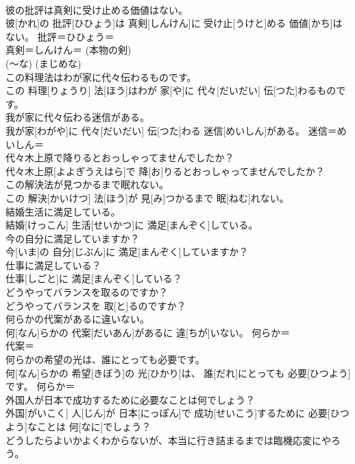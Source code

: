 \documentclass[8pt]{extreport}
\begin{document}
\begin{CJK}{UTF8}{min}
\\	彼の批評は真剣に受け止める価値はない。	
\\	彼[かれ]の 批評[ひひょう]は 真剣[しんけん]に 受け止[うけと]める 価値[かち]はない。	批評＝ひひょう＝ 
\\	真剣＝しんけん＝ (本物の剣) 
\\	(〜な) (まじめな) 
\\	この料理法はわが家に代々伝わるものです。	
\\	この 料理[りょうり] 法[ほう]はわが 家[や]に 代々[だいだい] 伝[つた]わるものです。	
\\	我が家に代々伝わる迷信がある。	
\\	我が家[わがや]に 代々[だいだい] 伝[つた]わる 迷信[めいしん]がある。	迷信＝めいしん＝ 
\\	代々木上原で降りるとおっしゃってませんでしたか？	
\\	代々木上原[よよぎうえはら]で 降[お]りるとおっしゃってませんでしたか？	
\\	この解決法が見つかるまで眠れない。	
\\	この 解決[かいけつ] 法[ほう]が 見[み]つかるまで 眠[ねむ]れない。	
\\	結婚生活に満足している。	
\\	結婚[けっこん] 生活[せいかつ]に 満足[まんぞく]している。	
\\	今の自分に満足していますか？	
\\	今[いま]の 自分[じぶん]に 満足[まんぞく]していますか？	
\\	仕事に満足している？	
\\	仕事[しごと]に 満足[まんぞく]している？	
\\	どうやってバランスを取るのですか？	
\\	どうやってバランスを 取[と]るのですか？	
\\	何らかの代案があるに違いない。	
\\	何[なん]らかの 代案[だいあん]があるに 違[ちが]いない。	何らか＝ 
\\	代案＝ 
\\	何らかの希望の光は、誰にとっても必要です。	
\\	何[なん]らかの 希望[きぼう]の 光[ひかり]は、 誰[だれ]にとっても 必要[ひつよう]です。	何らか＝ 
\\	外国人が日本で成功するために必要なことは何でしょう？	
\\	外国[がいこく] 人[じん]が 日本[にっぽん]で 成功[せいこう]するために 必要[ひつよう]なことは 何[なに]でしょう？	
\\	どうしたらよいかよくわからないが、本当に行き詰まるまでは臨機応変にやろう。	

\end{CJK}
\end{document}
